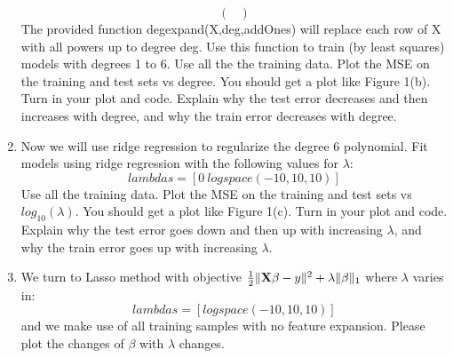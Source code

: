 \documentclass[11pt]{article}
\newcommand{\vct}[1]{\mathbf{#1}}
\def \mU {\mtx{U}}
\def \mS {\mtx{S}}
\def \mX {\mtx{X}}
\def \vu {\vct{u}}
\begin{document}
\begin{enumerate}
\begin{equation}
\begin{pmatrix}
		\end{pmatrix}
	\end{equation}
The provided function degexpand(X,deg,addOnes) will replace each row of X with all powers up to degree deg. Use
this function to train (by least squares) models with degrees 1 to 6. Use all the the training data. Plot the MSE on
the training and test sets vs degree. You should get a plot like Figure 1(b). Turn in your plot and code. Explain
why the test error decreases and then increases with degree, and why the train error decreases with degree.
\item Now we will use ridge regression to regularize the degree 6 polynomial. Fit models using ridge regression with
the following values for $\lambda$:
$$lambdas=[0 \  logspace(-10,10,10)]$$
Use all the training data. Plot the MSE on the training and test sets vs $log_{10}(\lambda)$. You should get a plot like
Figure 1(c). Turn in your plot and code. Explain why the test error goes down and then up with increasing $\lambda$,
and why the train error goes up with increasing $\lambda$.
\item We turn to Lasso method with objective $\frac{1}{2}\|\mX \beta-y\|^2+\lambda\|\beta\|_1$ where $\lambda$ varies in: $$lambdas=[logspace(-10,10,10)]$$ and we make use of all training samples with no feature expansion. Please plot the changes of $\beta$ with $\lambda$ changes.
\end{enumerate}

\end{document}
